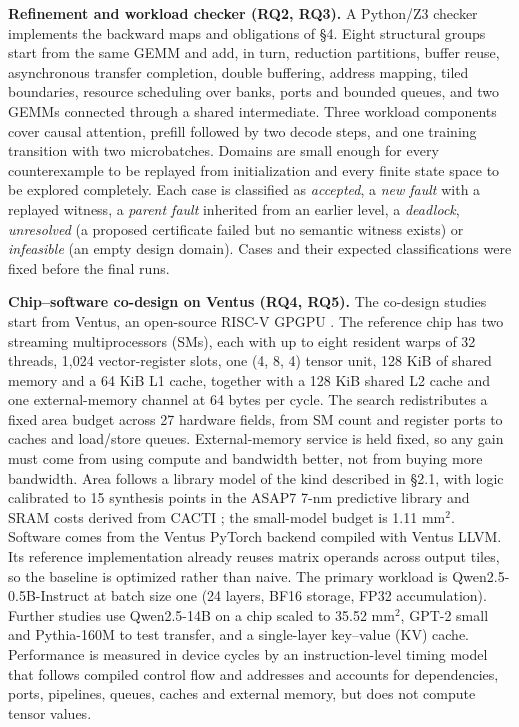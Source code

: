 \documentclass[11pt]{article}
\begin{document}
\textbf{Refinement and workload checker (RQ2, RQ3).} A Python/Z3 checker implements the backward maps and obligations of §4. Eight structural groups start from the same GEMM and add, in turn, reduction partitions, buffer reuse, asynchronous transfer completion, double buffering, address mapping, tiled boundaries, resource scheduling over banks, ports and bounded queues, and two GEMMs connected through a shared intermediate. Three workload components cover causal attention, prefill followed by two decode steps, and one training transition with two microbatches. Domains are small enough for every counterexample to be replayed from initialization and every finite state space to be explored completely. Each case is classified as \emph{accepted}, a \emph{new fault} with a replayed witness, a \emph{parent fault} inherited from an earlier level, a \emph{deadlock}, \emph{unresolved} (a proposed certificate failed but no semantic witness exists) or \emph{infeasible} (an empty design domain). Cases and their expected classifications were fixed before the final runs.

\textbf{Chip--software co-design on Ventus (RQ4, RQ5).} The co-design studies start from Ventus, an open-source RISC-V GPGPU \cite{r89}. The reference chip has two streaming multiprocessors (SMs), each with up to eight resident warps of 32 threads, 1,024 vector-register slots, one (4, 8, 4) tensor unit, 128 KiB of shared memory and a 64 KiB L1 cache, together with a 128 KiB shared L2 cache and one external-memory channel at 64 bytes per cycle. The search redistributes a fixed area budget across 27 hardware fields, from SM count and register ports to caches and load/store queues. External-memory service is held fixed, so any gain must come from using compute and bandwidth better, not from buying more bandwidth. Area follows a library model of the kind described in §2.1, with logic calibrated to 15 synthesis points in the ASAP7 7-nm predictive library \cite{r92} and SRAM costs derived from CACTI \cite{r56}; the small-model budget is 1.11 mm\ensuremath{^2}. Software comes from the Ventus PyTorch backend compiled with Ventus LLVM. Its reference implementation already reuses matrix operands across output tiles, so the baseline is optimized rather than naive. The primary workload is Qwen2.5-0.5B-Instruct \cite{r93} at batch size one (24 layers, BF16 storage, FP32 accumulation). Further studies use Qwen2.5-14B on a chip scaled to 35.52 mm\ensuremath{^2}, GPT-2 small \cite{r94} and Pythia-160M \cite{r95} to test transfer, and a single-layer key--value (KV) cache. Performance is measured in device cycles by an instruction-level timing model that follows compiled control flow and addresses and accounts for dependencies, ports, pipelines, queues, caches and external memory, but does not compute tensor values.
\end{document}
